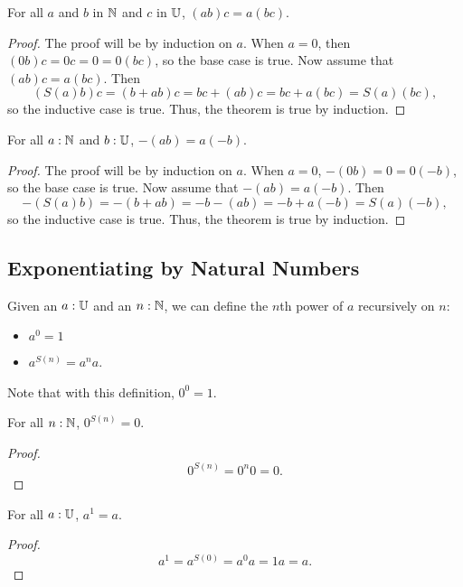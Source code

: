 \documentclass[../math.tex]{subfiles}
\begin{document}
\begin{theorem}
    For all $a$ and $b$ in $\mathbb{N}$ and $c$ in $\mathbb{U}$, $(ab)c = a(bc)$.
\end{theorem}
\begin{proof}
    The proof will be by induction on $a$.  When $a = 0$, then $(0b)c = 0c = 0 =
    0(bc)$, so the base case is true.  Now assume that $(ab)c = a(bc)$.
    Then
    \[
        (S(a)b)c = (b + ab)c = bc + (ab)c = bc + a(bc) = S(a)(bc),
    \]
    so the inductive case is true.  Thus, the theorem is true by induction.
\end{proof}

\begin{theorem}
    For all $a : \mathbb{N}$ and $b : \mathbb{U}$, $-(ab) = a(-b)$.
\end{theorem}
\begin{proof}
    The proof will be by induction on $a$.  When $a = 0$, $-(0b) = 0 = 0(-b)$,
    so the base case is true.  Now assume that $-(ab) = a(-b)$.  Then
    \[
        -(S(a)b) = -(b + ab) = -b - (ab) = -b + a(-b) = S(a)(-b),
    \]
    so the inductive case is true.  Thus, the theorem is true by induction.
\end{proof}

\subsection{Exponentiating by Natural Numbers}

\begin{definition}
    Given an $a : \mathbb{U}$ and an $n : \mathbb{N}$, we can define the $n$th power of $a$
    recursively on $n$:
    \begin{itemize}
        \item $a^0 = 1$
        \item $a^{S(n)} = a^na$.
    \end{itemize}
    Note that with this definition, $0^0 = 1$.
\end{definition}

\begin{theorem}
    For all $n : \mathbb{N}$, $0^{S(n)} = 0$.
\end{theorem}
\begin{proof}
    \[
        0^{S(n)} = 0^n0 = 0.
    \]
\end{proof}

\begin{theorem}
    For all $a : \mathbb{U}$, $a^1 = a$.
\end{theorem}
\begin{proof}
    \[
        a^1 = a^{S(0)} = a^0a = 1a = a.
    \]
\end{proof}
\end{document}
